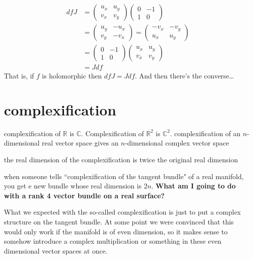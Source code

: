 \begin{align*}
df J&=\begin{pmatrix}u_x&u_y\\ v_x&v_y\end{pmatrix}\begin{pmatrix} 0& -1\\ 1&0\end{pmatrix}\\
&=\begin{pmatrix}u_y&-u_x\\ v_y&-v_x\end{pmatrix}=\begin{pmatrix}-v_x&-v_y\\ u_x&u_y\end{pmatrix}\\
&=\begin{pmatrix}0&-1\\ 1&0\end{pmatrix}\begin{pmatrix}u_x&u_y\\ v_x&v_y\end{pmatrix}\\
&=Jdf
\end{align*}
\fi
That is, if \(f\) is holomorphic then \(df J=J df\). And then there's the converse…

\section{complexification}

complexification of \(\mathbb{R}\) is \(\mathbb{C}\). Complexification of \(\mathbb{R}^2\) is \(\mathbb{C}^2\). complexification of an \(n\)-dimensional real vector space gives an \(n\)-dimensional complex vector space
\begin{tcolorbox}[colback=white,colframe=black,boxrule=0.5pt,sharp corners]
the real dimension of the complexification is twice the original real dimension
\end{tcolorbox}
when someone tells ``complexification of the tangent bundle" of a real manifold, you get e new bundle whose real dimension is \(2n\). \textbf{What am I going to do with a rank 4 vector bundle on a real surface?}

What we expected with the so-called complexification is just to put a complex structure on the tangent bundle. At some point we were convinced that this would only work if the manifold is of even dimension, so it makes sense to somehow introduce a complex multiplication or something in these even dimensional vector spaces at once.

